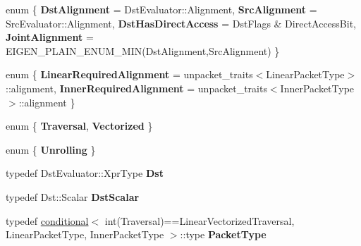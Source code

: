 \begin{DoxyCompactItemize}
enum \{ {\bfseries Dst\+Alignment} = Dst\+Evaluator\+:\+:Alignment, 
{\bfseries Src\+Alignment} = Src\+Evaluator\+:\+:Alignment, 
{\bfseries Dst\+Has\+Direct\+Access} = Dst\+Flags \& Direct\+Access\+Bit, 
{\bfseries Joint\+Alignment} = E\+I\+G\+E\+N\+\_\+\+P\+L\+A\+I\+N\+\_\+\+E\+N\+U\+M\+\_\+\+M\+IN(Dst\+Alignment,Src\+Alignment)
 \}
\item 
\mbox{\label{struct_eigen_1_1internal_1_1copy__using__evaluator__traits_acadd7e09cbae33f196593d40094c6f26}} 
enum \{ {\bfseries Linear\+Required\+Alignment} = unpacket\+\_\+traits$<$Linear\+Packet\+Type$>$\+:\+:alignment, 
{\bfseries Inner\+Required\+Alignment} = unpacket\+\_\+traits$<$Inner\+Packet\+Type$>$\+:\+:alignment
 \}
\item 
\mbox{\label{struct_eigen_1_1internal_1_1copy__using__evaluator__traits_ad8cd111a7bfe8a5237faabd1a9049744}} 
enum \{ {\bfseries Traversal}, 
{\bfseries Vectorized}
 \}
\item 
\mbox{\label{struct_eigen_1_1internal_1_1copy__using__evaluator__traits_a5e12aec37595c5a00bd5ffd31ca13f3f}} 
enum \{ {\bfseries Unrolling}
 \}
\item 
\mbox{\label{struct_eigen_1_1internal_1_1copy__using__evaluator__traits_a3f82645c1639690df8d7c786a86b6d76}} 
typedef Dst\+Evaluator\+::\+Xpr\+Type {\bfseries Dst}
\item 
\mbox{\label{struct_eigen_1_1internal_1_1copy__using__evaluator__traits_af449f8796c0ea6e750096672bad13525}} 
typedef Dst\+::\+Scalar {\bfseries Dst\+Scalar}
\item 
\mbox{\label{struct_eigen_1_1internal_1_1copy__using__evaluator__traits_acfc32ecb7201ba969f37e61c65e9b934}} 
typedef \hyperlink{struct_eigen_1_1internal_1_1conditional}{conditional}$<$ int(Traversal)==Linear\+Vectorized\+Traversal, Linear\+Packet\+Type, Inner\+Packet\+Type $>$\+::type {\bfseries Packet\+Type}
\item 
\mbox{\label{struct_eigen_1_1internal_1_1copy__using__evaluator__traits_a3f82645c1639690df8d7c786a86b6d76}} 

\end{DoxyCompactItemize}
